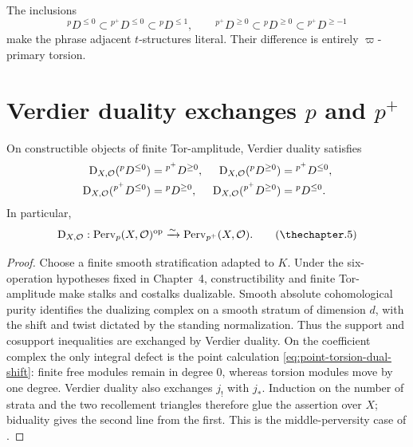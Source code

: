 \begin{remark}
The inclusions
\[
  {}^pD^{\leq0}\subset{}^{p^+}D^{\leq0}\subset{}^pD^{\leq1},\qquad
  {}^{p^+}D^{\geq0}\subset{}^pD^{\geq0}\subset{}^{p^+}D^{\geq-1}
\]
make the phrase adjacent \(t\)-structures literal.  Their difference is
entirely \(\varpi\)-primary torsion.
\end{remark}

\section{Verdier duality exchanges \texorpdfstring{\(p\) and \(p^+\)}{p and p+}}

\begin{theorem}
\label{thm:integral-verdier-exchange}
On constructible objects of finite Tor-amplitude, Verdier duality satisfies
\begin{equation}
\begin{aligned}
  \mathrm D_{X,\mathcal O}({}^pD^{\leq0})
    &={} ^{p^+}D^{\geq0},&
  \mathrm D_{X,\mathcal O}({}^pD^{\geq0})
    &={} ^{p^+}D^{\leq0},\\
  \mathrm D_{X,\mathcal O}({}^{p^+}D^{\leq0})
    &={} ^pD^{\geq0},&
  \mathrm D_{X,\mathcal O}({}^{p^+}D^{\geq0})
    &={} ^pD^{\leq0}.
\end{aligned}
\label{eq:duality-exchanges-p-pplus}
\end{equation}
In particular,
\[
  \D_{X,\mathcal O}:\Perv_p(X,\mathcal O)^{\op}\xrightarrow{\sim}
  \Perv_{p^+}(X,\mathcal O).
\tag{\thechapter.5}\label{eq:duality-hearts-p-pplus}
\]
\end{theorem}

\begin{proof}
Choose a finite smooth stratification adapted to \(K\).  Under the
six-operation hypotheses fixed in Chapter~4, constructibility and finite
Tor-amplitude make stalks and costalks dualizable.  Smooth absolute
cohomological purity identifies the dualizing complex on a smooth stratum of
dimension \(d\), with the shift and twist dictated by the standing
normalization.  Thus the support and cosupport inequalities are exchanged by
Verdier duality.  On the coefficient complex the only integral defect is the
point calculation \eqref{eq:point-torsion-dual-shift}: finite free modules
remain in degree \(0\), whereas torsion modules move by one degree.
Verdier duality also exchanges \(j_!\) with \(j_*\).  Induction on the number
of strata and the two recollement triangles therefore glue the assertion
over \(X\); biduality gives the second line from the first.  This is the
middle-perversity case of \cite[\S3.3.3--3.3.4]{BBD}.
\end{proof}

